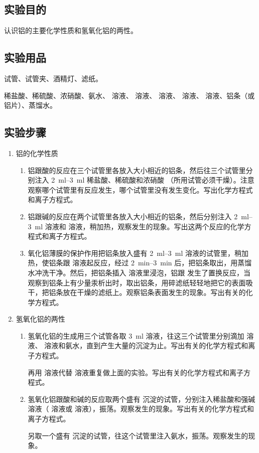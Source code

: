 \subsection*{实验目的}
认识铝的主要化学性质和氢氧化铝的两性。

\subsection*{实验用品}
试管、试管夹、酒精灯、滤纸。

稀盐酸、稀硫酸、浓硝酸、氨水、 溶液、 溶液、 溶液、 溶液、  溶液、铝条（或铝片）、蒸馏水。

\subsection*{实验步骤}
\begin{enumerate}[1.]
  \item 铝的化学性质
  \begin{enumerate}[(1)]
    \item 铝跟酸的反应\quad 在三个试管里各放入大小相近的铝条，然后往三个试管里分别注入 \qtyrange{2}{3}{ml} 稀盐酸、稀硫酸和浓硝酸 （所用试管必须干燥）。注意观察哪个试管里有反应发生，哪个试管里没有发生变化。写出化学方程式和离子方程式。
    \item 铝跟碱的反应\quad 在两个试管里各放入大小相近的铝条，然后分别注入 \qtyrange{2}{3}{ml}  溶液和  溶液，稍加热，观察发生的现象。写出这两个反应的化学方程式和离子方程式。
    \item 氧化铝薄膜的保护作用\quad 把铝条放入盛有 \qtyrange{2}{3}{ml}  溶液的试管里，稍加热，使铝条跟  溶液起反应，经过 \qtyrange{2}{3}{min} 后，把铝条取出，用蒸馏水冲洗干净。然后，把铝条插入  溶液里浸泡，铝跟  发生了置换反应，当观察到铝条上有少量汞析出时，取出铝条，用碎滤纸轻轻地把它的表面吸干，把铝条放在干燥的滤纸上。观察铝条表面发生的现象。写出有关的化学方程式。
  \end{enumerate}
  \item 氢氧化铝的两性
  \begin{enumerate}[(1)]
    \item 氢氧化铝的生成\quad 用三个试管各取 \qty{3}{ml}  溶液，往这三个试管里分别滴加  溶液、 溶液和氨水，直到产生大量的沉淀为止。写出有关的化学方程式和离子方程式。

再用  溶液代替  溶液重复做上面的实验。写出有关的化学方程式和离子方程式。
    \item 氢氧化铝跟酸和碱的反应\quad 取两个盛有  沉淀的试管，分别注入稀盐酸和强碱溶液（ 溶液或  溶液），振荡。观察发生的现象。写出有关的化学方程式和离子方程式。

另取一个盛有  沉淀的试管，往这个试管里注入氨水，振荡。观察发生的现象。
  \end{enumerate}
\end{enumerate}
